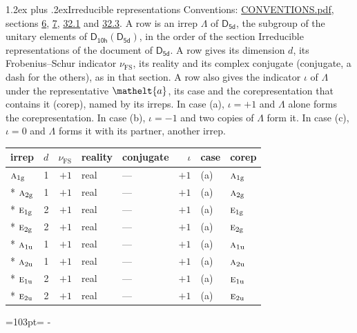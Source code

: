\documentclass[10pt,a4paper]{article}
\makeatletter
\renewcommand\section{\@startsection{section}{1}{\z@}{-3ex plus -1ex minus -.2ex}%
  {1.2ex plus .2ex}{\normalfont\large\sffamily\bfseries\color{parttitle}}}
\newcommand{\needspace}[1]{\par\penalty-100\begingroup\dimen0=#1\relax\dimen2=\pagegoal
  \advance\dimen2-\pagetotal\ifdim\dimen0>\dimen2\relax\ifdim\dimen2>0pt\vfil\break\fi\fi
  \endgroup}
\numberwithin{equation}{section}
\newcommand{\eltfont}[1]{{\let\sigma\eltsigma\mathelt{#1}}}
\newcommand{\grp}[1]{\mathsf{#1}}
\newcommand{\irr}[1]{\text{\normalfont\scshape #1}}
\newcommand{\elt}[1]{\eltfont{#1}}
\newcommand{\ptag}[1]{\mathrm{#1}}
\newcommand{\fsind}{\nu_{\mathrm{FS}}}
\makeatother
\begin{document}
\section{Irreducible representations}\label{s:irreps}
Conventions: \href{../../CONVENTIONS.pdf}{CONVENTIONS.pdf}, sections \href{../../../rotation/CONVENTIONS.pdf\#conv.6}{6}, \href{../../../rotation/CONVENTIONS.pdf\#conv.7}{7}, \href{../../CONVENTIONS.pdf\#conv.32.1}{32.1} and \href{../../CONVENTIONS.pdf\#conv.32.3}{32.3}.
\leavevmode\label{n:irrep.Delta}A row is an irrep $\Lambda$ of $\grp{D_{5d}}$, the subgroup of the unitary elements of $\grp{D_{10h}}(\grp{D_{5d}})$, in the order of the section Irreducible representations of the document of \href{../../../rotation/data/pdf/D5d.pdf}{$\grp{D_{5d}}$}. \label{n:index.dimension}\label{n:index.frobenius}\label{n:head.irrep}\label{n:head.reality}\label{n:head.conjugate}A row gives its dimension $d$, its Frobenius--Schur indicator $\fsind$, its reality and its complex conjugate (conjugate, a dash for the others), as in that section. \label{n:head.case.corep}\label{n:head.corep}A row also gives the indicator $\iota$ of $\Lambda$ under the representative $\elt{a}$, its case and the corepresentation that contains it (corep), named by its irreps. In case (a), $\iota = +1$ and $\Lambda$ alone forms the corepresentation. In case (b), $\iota = -1$ and two copies of $\Lambda$ form it. In case (c), $\iota = 0$ and $\Lambda$ forms it with its partner, another irrep.
\setlength{\emergencystretch}{2em}\par\setlength{\emergencystretch}{0pt}
{\small\renewcommand{\arraystretch}{1.25}\setlength{\tabcolsep}{4pt}\begin{longtable}{@{}lrrllrll@{}}\toprule
irrep & $d$ & $\fsind$ & reality & conjugate & $\iota$ & case & corep\\\midrule\endhead
\bottomrule\endfoot\endlastfoot
$\irr{a}_{1\ptag{g}}$ & 1 & $+1$ & real & --- & $+1$ & (a) & $\irr{a}_{1\ptag{g}}$\\*
$\irr{a}_{2\ptag{g}}$ & 1 & $+1$ & real & --- & $+1$ & (a) & $\irr{a}_{2\ptag{g}}$\\*
$\irr{e}_{1\ptag{g}}$ & 2 & $+1$ & real & --- & $+1$ & (a) & $\irr{e}_{1\ptag{g}}$\\*
$\irr{e}_{2\ptag{g}}$ & 2 & $+1$ & real & --- & $+1$ & (a) & $\irr{e}_{2\ptag{g}}$\\*
$\irr{a}_{1\ptag{u}}$ & 1 & $+1$ & real & --- & $+1$ & (a) & $\irr{a}_{1\ptag{u}}$\\*
$\irr{a}_{2\ptag{u}}$ & 1 & $+1$ & real & --- & $+1$ & (a) & $\irr{a}_{2\ptag{u}}$\\*
$\irr{e}_{1\ptag{u}}$ & 2 & $+1$ & real & --- & $+1$ & (a) & $\irr{e}_{1\ptag{u}}$\\*
$\irr{e}_{2\ptag{u}}$ & 2 & $+1$ & real & --- & $+1$ & (a) & $\irr{e}_{2\ptag{u}}$\\
\bottomrule\end{longtable}}
\needspace{103pt}
\end{document}
